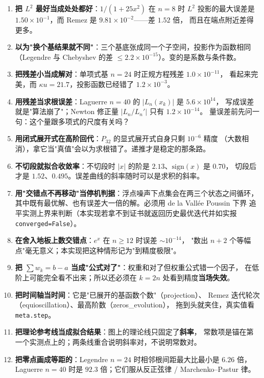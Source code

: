 \begin{enumerate}
  \item \textbf{把 $L^2$ 最好当成处处都好}：$1/(1+25x^2)$ 在 $n=8$ 时 $L^2$ 投影的最大误差是
        $1.50\times10^{-1}$，而 Remez 是 $9.81\times10^{-2}$——差 $1.52$ 倍，
        而且在端点附近差得更多。
  \item \textbf{以为"换个基结果就不同"}：三个基底张成同一个子空间，投影作为函数相同
        （Legendre 与 Chebyshev 的差 $\le2.2\times10^{-15}$）。变的是系数与条件数。
  \item \textbf{把残差小当成解对}：单项式基 $n=24$ 时正规方程残差 $1.0\times10^{-11}$，
        看起来完美，而 $\kappa u=21.7$，投影函数已经错了 $1.2\times10^{-3}$。
  \item \textbf{用残差当求根误差}：Laguerre $n=40$ 的 $|L_n(x_k)|$ 是 $5.6\times10^{14}$，
        写成误差就是"算法崩了"；Newton 修正量 $|L_n/L_n'|$ 只有 $1.2\times10^{-14}$。
        量误差前先问一句：这个量跟多项式的尺度有关吗？
  \item \textbf{用闭式展开式在高阶回代}：$P_{32}$ 的显式展开式自身只剩 $10^{-6}$ 精度
        （大数相消），拿它当"真值"会以为求根错了。递推才是稳定的那条路。
  \item \textbf{不切段就拟合收敛率}：不切段时 $|x|$ 的阶是 $2.13$、$\mathrm{sign}(x)$ 是 $0.70$，
        切段后才是 $1.52$、$0.495$。误差曲线的斜率随时可以是求积的斜率。
  \item \textbf{用"交错点不再移动"当停机判据}：浮点噪声下点集会在两三个状态之间循环，
        其中既有最优解、也有误差大一倍的解。必须用 de la Vall\'ee Poussin 下界
        追平实测上界来判断（本实现若拿不到证书就返回历史最优迭代并如实报
        \texttt{converged=False}）。
  \item \textbf{在舍入地板上数交错点}：$e^x$ 在 $n\ge12$ 时误差 $\sim10^{-14}$，
        "数出 $n+2$ 个等幅点"毫无意义；本实现把这种情形记为"到精度极限"。
  \item \textbf{把 $\sum w_k=b-a$ 当成"公式对了"}：权重和对了但权重公式错一个因子，
        在低阶上可能完全看不出来；所以还必须在 $k=2n$ 处看到精度\textbf{当场失效}。
  \item \textbf{把时间轴当时间}：它是"已展开的基函数个数"（projection）、
        Remez 迭代轮次（equioscillation）、最高阶数（zeros\_evolution），
        拖到头就夹住，真实值看 \texttt{meta.step}。
  \item \textbf{把理论参考线当成拟合结果}：图上的理论线只固定了\textbf{斜率}，
        常数项是锚在第一个实测点上的；两条线重合说明斜率对，不说明常数对。
  \item \textbf{把零点画成等距的}：Legendre $n=24$ 时相邻根间距最大比最小是 $6.26$ 倍，
        Laguerre $n=40$ 时是 $92.3$ 倍；它们服从反正弦律 / Marchenko--Pastur 律。
\end{enumerate}
